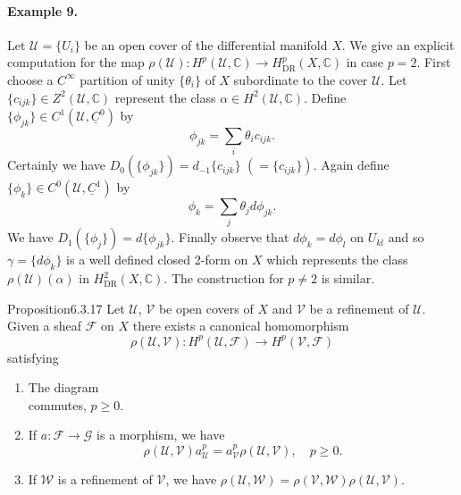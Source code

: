 \paragraph{Example 9.} Let $\mathcal U=\{U_i\}$ be an open cover of the differential manifold $X$. We give an explicit computation for the map $\rho(\mathcal U):H^p(\mathcal U,\mathbb C)\to H^p_{\mathrm{DR}}(X,\mathbb C)$ in case $p=2$. First choose a $C^\infty$ partition of unity $\{\theta_i\}$ of $X$ subordinate to the cover $\mathcal U$. Let $\{c_{ijk}\}\in Z^2(\mathcal U,\mathbb C)$ represent the class $\alpha\in H^2(\mathcal U,\mathbb C)$. Define $\{\phi_{jk}\}\in C^1(\mathcal U,\underline C^0)$ by
\[
\phi_{jk}=\sum_i\theta_i c_{ijk}.
\]
Certainly we have $D_0(\{\phi_{jk}\})=d_{-1}\{c_{ijk}\}$ $(=\{c_{ijk}\})$. Again define $\{\phi_k\}\in C^0(\mathcal U,\underline C^1)$ by
\[
\phi_k=\sum_j\theta_jd\phi_{jk}.
\]
We have $D_1(\{\phi_j\})=d\{\phi_{jk}\}$. Finally observe that $d\phi_k=d\phi_l$ on $U_{kl}$ and so $\gamma=\{d\phi_k\}$ is a well defined closed 2-form on $X$ which represents the class $\rho(\mathcal U)(\alpha)$ in $H^2_{\mathrm{DR}}(X,\mathbb C)$. The construction for $p\neq2$ is similar.
\begin{originaltheorem}{Proposition}{6.3.17}
Let $\mathcal U$, $\mathcal V$ be open covers of $X$ and $\mathcal V$ be a refinement of $\mathcal U$. Given a sheaf $\mathcal F$ on $X$ there exists a canonical homomorphism
\[
\rho(\mathcal U,\mathcal V):H^p(\mathcal U,\mathcal F)\to H^p(\mathcal V,\mathcal F)
\]
satisfying
\begin{enumerate}
\item The diagram
\[

\]
commutes, $p\geq0$.
\item If $a:\mathcal F\to\mathcal G$ is a morphism, we have
\[
\rho(\mathcal U,\mathcal V)a_{\mathcal U}^p=a_{\mathcal V}^p\rho(\mathcal U,\mathcal V),\quad p\geq0.
\]
\item If $\mathcal W$ is a refinement of $\mathcal V$, we have $\rho(\mathcal U,\mathcal W)=\rho(\mathcal V,\mathcal W)\rho(\mathcal U,\mathcal V)$.
\end{enumerate}
\end{originaltheorem}
